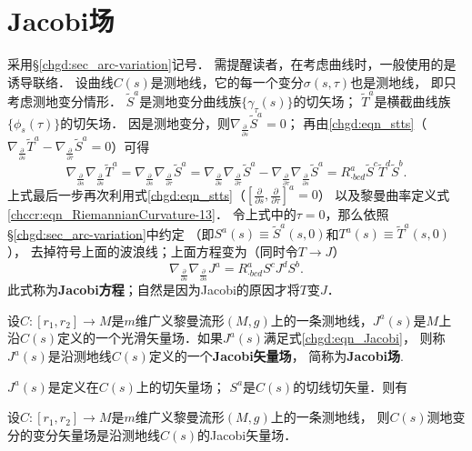 \section{Jacobi场}\label{chgd:sec_Jacobi}
采用\S \ref{chgd:sec_arc-variation}记号．
需提醒读者，在考虑曲线时，一般使用的是诱导联络．
设曲线$C(s)$是测地线，它的每一个变分$\sigma(s,\tau)$也是测地线，
即只考虑{\kaishu 测地变分}情形．
$\tilde{S}^a$是测地变分曲线族$\{\gamma_\tau(s)\}$的切矢场；
$\tilde{T}^a$是横截曲线族$\{\phi_s(\tau)\}$的切矢场．
因是测地变分，则$ \nabla_{\frac{\partial}{\partial s}}\tilde{S}^a=0$；
再由\eqref{chgd:eqn_stts}（$ \nabla_{\frac{\partial}{\partial s}}\tilde{T}^a
- \nabla_{\frac{\partial}{\partial \tau}}\tilde{S}^a =0$）可得
\begin{equation}
    \nabla_{\frac{\partial}{\partial s}} \nabla_{\frac{\partial}{\partial s}}\tilde{T}^a
    =\nabla_{\frac{\partial}{\partial s}} \nabla_{\frac{\partial}{\partial \tau}}\tilde{S}^a
    =\nabla_{\frac{\partial}{\partial s}} \nabla_{\frac{\partial}{\partial \tau}}\tilde{S}^a
     -\nabla_{\frac{\partial}{\partial \tau}} \nabla_{\frac{\partial}{\partial s}}\tilde{S}^a
    =R^{a}_{\cdot bcd} \tilde{S}^c\tilde{T}^d \tilde{S}^b .
\end{equation}
上式最后一步再次利用式\eqref{chgd:eqn_stts}（$\left[\frac{\partial}{\partial s},
\frac{\partial}{\partial \tau}\right]^a = 0$）
以及黎曼曲率定义式\eqref{chccr:eqn_RiemannianCurvature-13}．
令上式中的$\tau=0$，那么依照\S \ref{chgd:sec_arc-variation}中约定
（即$S^a(s)\equiv \tilde{S}^a(s,0)$和$T^a(s)\equiv \tilde{T}^a(s,0)$），
去掉符号上面的波浪线；上面方程变为（同时令$T\to J$）
\begin{equation}\label{chgd:eqn_Jacobi}
    \nabla_{\frac{\partial}{\partial s}} \nabla_{\frac{\partial}{\partial s}}{J}^a =
    R^{a}_{\cdot bcd} {S}^c{J}^d {S}^b.
\end{equation}
此式称为{\bfseries \heiti Jacobi方程}；自然是因为Jacobi的原因才将$T$变$J$．


\begin{definition}\label{chgd:def_Jacobi-field}
    设$C:[r_1,r_2]\to M$是$m$维广义黎曼流形$(M,g)$上的一条测地线，$J^a(s)$是$M$上
    沿$C(s)$定义的一个光滑矢量场．如果$J^a(s)$满足式\eqref{chgd:eqn_Jacobi}，
    则称$J^a(s)$是沿测地线$C(s)$定义的一个{\bfseries \heiti Jacobi矢量场}，
    简称为{\bfseries \heiti Jacobi场}.
\end{definition}
$J^a(s)$是定义在$C(s)$上的切矢量场；
$S^a$是$C(s)$的切线切矢量．则有
\begin{proposition}\label{chgd:thm_vvJ}
    设$C:[r_1,r_2]\to M$是$m$维广义黎曼流形$(M,g)$上的一条测地线，
    则$C(s)$测地变分的变分矢量场是沿测地线$C(s)$的Jacobi矢量场．
\end{proposition}




